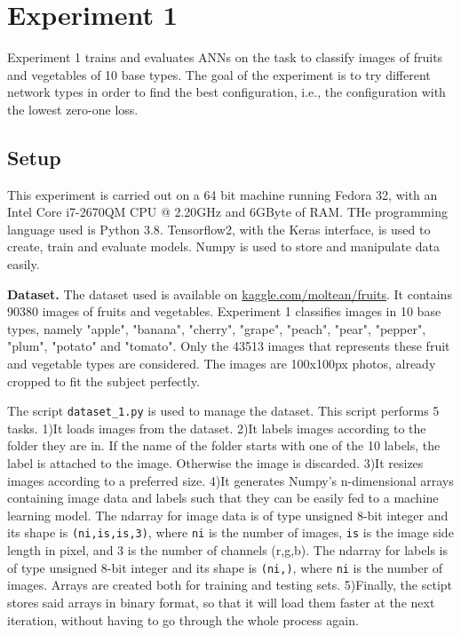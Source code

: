 \section{Experiment 1}
\label{sec:exp1}
Experiment 1 trains and evaluates ANNs on the task to classify images of fruits and vegetables of 10 base types. The goal of the experiment is to try different network types in order to find the best configuration, i.e., the configuration with the lowest zero-one loss.
\subsection{Setup}
This experiment is carried out on a 64 bit machine running Fedora 32, with an Intel\textsuperscript{\textregistered} Core\texttrademark{} i7-2670QM CPU @ 2.20GHz and 6GByte of RAM. THe programming language used is Python 3.8\cite{python3}. Tensorflow2\cite{tensorflow2015-whitepaper}, with the Keras\cite{chollet2015keras} interface, is used to create, train and evaluate models. Numpy\cite{harris2020array} is used to store and manipulate data easily.

\textbf{Dataset.} The dataset used is available on \href{https://www.kaggle.com/moltean/fruits}{kaggle.com/moltean/fruits}. It contains 90380 images of fruits and vegetables. Experiment 1 classifies images in 10 base types, namely "apple", "banana", "cherry", "grape", "peach", "pear", "pepper", "plum", "potato" and "tomato". Only the 43513 images that represents these fruit and vegetable types are considered. The images are 100x100px photos, already cropped to fit the subject perfectly.

The script \texttt{dataset\_1.py} is used to manage the dataset. This script performs 5 tasks. 1)It loads images from the dataset. 2)It labels images according to the folder they are in. If the name of the folder starts with one of the 10 labels, the label is attached to the image. Otherwise the image is discarded. 3)It resizes images according to a preferred size. 4)It generates Numpy's n-dimensional arrays containing image data and labels such that they can be easily fed to a machine learning model. The ndarray for image data is of type unsigned 8-bit integer and its shape is \texttt{(ni,is,is,3)}, where \texttt{ni} is the number of images, \texttt{is} is the image side length in pixel, and 3 is the number of channels (r,g,b). The ndarray for labels is of type unsigned 8-bit integer and its shape is \texttt{(ni,)}, where \texttt{ni} is the number of images. Arrays are created both for training and testing sets. 5)Finally, the sctipt stores said arrays in binary format, so that it will load them faster at the next iteration, without having to go through the whole process again.

